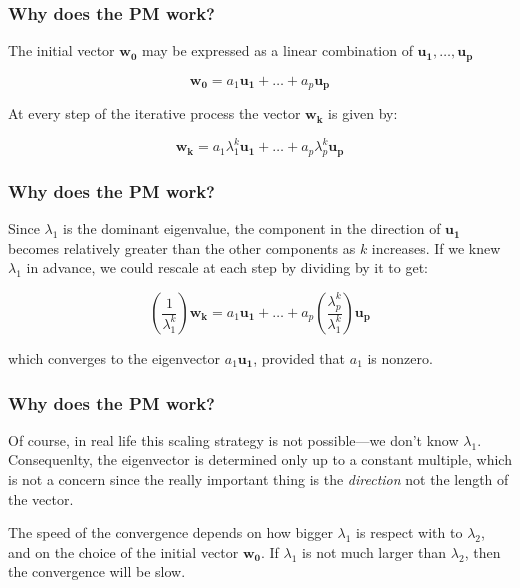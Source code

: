\documentclass[12pt]{beamer}\usepackage[]{graphicx}\usepackage[]{color}
\begin{document}

\begin{frame}
\frametitle{Why does the PM work?}

The initial vector $\mathbf{w_0}$ may be expressed as a linear combination of 
$\mathbf{u_1}, \dots, \mathbf{u_p}$

$$
\mathbf{w_0} = a_1 \mathbf{u_1} + \dots + a_p \mathbf{u_p}
$$

At every step of the iterative process the vector $\mathbf{w_k}$ is given by:

$$
\mathbf{w_k} = a_1 \lambda_{1}^k \mathbf{u_1} + \dots + a_p \lambda_{p}^k \mathbf{u_p}
$$

\end{frame}


\begin{frame}
\frametitle{Why does the PM work?}

Since $\lambda_1$ is the dominant eigenvalue, the component in the direction of 
$\mathbf{u_1}$ becomes relatively greater than the other components as $k$ 
increases. If we knew $\lambda_1$ in advance, we could rescale at each step by 
dividing by it to get:

$$
\left(\frac{1}{\lambda_{1}^k}\right) \mathbf{w_k}= a_1 \mathbf{u_1} + \dots + a_p \left(\frac{\lambda_{p}^k}{\lambda_{1}^k}\right) \mathbf{u_p}
$$

which converges to the eigenvector $a_1 \mathbf{u_1}$, provided that $a_1$ is nonzero.

\end{frame}


\begin{frame}
\frametitle{Why does the PM work?}

Of course, in real life this scaling strategy is not possible---we 
don't know $\lambda_1$. Consequenlty, the eigenvector is determined only up to 
a constant multiple, which is not a concern since the really important thing is 
the \textit{direction} not the length of the vector.

\bigskip
The speed of the convergence depends on how bigger $\lambda_1$ is respect with 
to $\lambda_2$, and on the choice of the initial vector $\mathbf{w_0}$. If 
$\lambda_1$ is not much larger than $\lambda_2$, then the convergence will be 
slow.

\end{frame}
\end{document}
